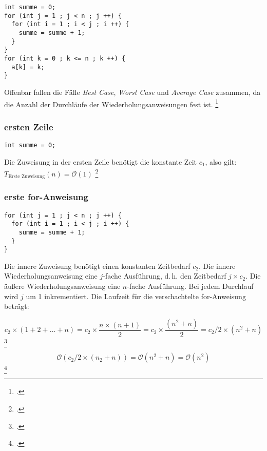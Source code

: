 \documentclass{lehramt-informatik-haupt}
\begin{document}
\begin{verbatim}
int summe = 0;
for (int j = 1 ; j < n ; j ++) {
  for (int i = 1 ; i < j ; i ++) {
    summe = summe + 1;
  }
}
for (int k = 0 ; k <= n ; k ++) {
  a[k] = k;
}
\end{verbatim}

\noindent
Offenbar fallen die Fälle \emph{Best Case}, \emph{Worst Case} und
\emph{Average Case} zusammen, da die Anzahl der Durchläufe der
Wiederholungsanweisungen fest ist.
\footcite[Seite 27 (PDF 19)]{aud:fs:2}

%

\subsubsection{ersten Zeile}

\begin{verbatim}
int summe = 0;
\end{verbatim}

\noindent
Die Zuweisung in der ersten Zeile benötigt die konstante Zeit $c_1$,
also gilt: $T_{\text{Erste Zuweisung}}(n) = \mathcal{O}(1)$
\footcite[Seite 28 (PDF 20)]{aud:fs:2}

%

\subsubsection{erste for-Anweisung}

\begin{verbatim}
for (int j = 1 ; j < n ; j ++) {
  for (int i = 1 ; i < j ; i ++) {
    summe = summe + 1;
  }
}
\end{verbatim}

\noindent
Die innere Zuweisung benötigt einen konstanten Zeitbedarf $c_2$. Die
innere Wiederholungsanweisung eine $j$-fache Ausführung, d.\,h. den
Zeitbedarf $j \times c_2$. Die äußere Wiederholungsanweisung eine
$n$-fache Ausführung. Bei jedem Durchlauf wird $j$ um 1 inkrementiert.
Die Laufzeit für die verschachtelte for-Anweisung beträgt:

\begin{displaymath}
c_2 \times (1 + 2 + \ldots + n) =
c_2 \times \frac{n \times (n + 1) }{2} =
c_2 \times \frac{(n^2 + n)}{2} =
c_2 / 2 \times (n^2 + n)
\end{displaymath}
\footcite{wiki:gausssche-summenformel}

\begin{displaymath}
\mathcal{O}(c_2 / 2 \times (n_2 + n)) =
\mathcal{O}(n^2 + n) =
\mathcal{O}(n^2)
\end{displaymath}
\footcite[Seite 29 (PDF 21)]{aud:fs:2}
\end{document}
